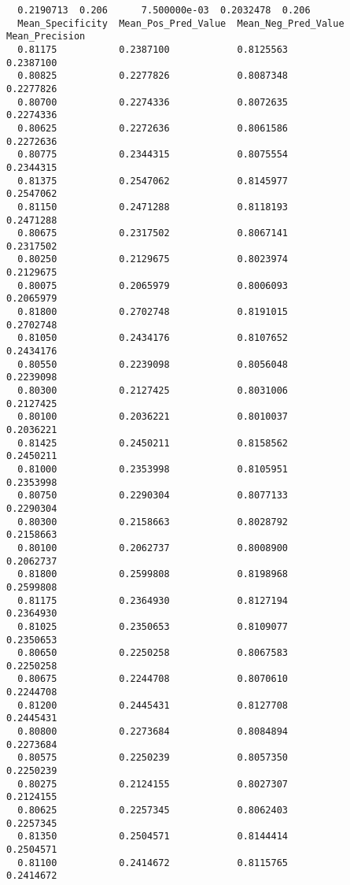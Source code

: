 \documentclass[
  letterpaper,
  DIV=11,
  numbers=noendperiod]{scrartcl}
\begin{document}
\begin{verbatim}
  0.2190713  0.206      7.500000e-03  0.2032478  0.206           
  Mean_Specificity  Mean_Pos_Pred_Value  Mean_Neg_Pred_Value  Mean_Precision
  0.81175           0.2387100            0.8125563            0.2387100     
  0.80825           0.2277826            0.8087348            0.2277826     
  0.80700           0.2274336            0.8072635            0.2274336     
  0.80625           0.2272636            0.8061586            0.2272636     
  0.80775           0.2344315            0.8075554            0.2344315     
  0.81375           0.2547062            0.8145977            0.2547062     
  0.81150           0.2471288            0.8118193            0.2471288     
  0.80675           0.2317502            0.8067141            0.2317502     
  0.80250           0.2129675            0.8023974            0.2129675     
  0.80075           0.2065979            0.8006093            0.2065979     
  0.81800           0.2702748            0.8191015            0.2702748     
  0.81050           0.2434176            0.8107652            0.2434176     
  0.80550           0.2239098            0.8056048            0.2239098     
  0.80300           0.2127425            0.8031006            0.2127425     
  0.80100           0.2036221            0.8010037            0.2036221     
  0.81425           0.2450211            0.8158562            0.2450211     
  0.81000           0.2353998            0.8105951            0.2353998     
  0.80750           0.2290304            0.8077133            0.2290304     
  0.80300           0.2158663            0.8028792            0.2158663     
  0.80100           0.2062737            0.8008900            0.2062737     
  0.81800           0.2599808            0.8198968            0.2599808     
  0.81175           0.2364930            0.8127194            0.2364930     
  0.81025           0.2350653            0.8109077            0.2350653     
  0.80650           0.2250258            0.8067583            0.2250258     
  0.80675           0.2244708            0.8070610            0.2244708     
  0.81200           0.2445431            0.8127708            0.2445431     
  0.80800           0.2273684            0.8084894            0.2273684     
  0.80575           0.2250239            0.8057350            0.2250239     
  0.80275           0.2124155            0.8027307            0.2124155     
  0.80625           0.2257345            0.8062403            0.2257345     
  0.81350           0.2504571            0.8144414            0.2504571     
  0.81100           0.2414672            0.8115765            0.2414672     

\end{verbatim}
\end{document}
